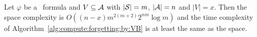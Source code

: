 \documentclass{article}
\begin{document}
\begin{proposition}\label{pro:time:alg1}
Let $\varphi$ be a \CTL\ formula and $V\subseteq {\cal A}$ with $|{\cal S}|=m$, $|{\cal A}|=n$ and $|V|=x$. Then the space complexity is $O((n-x)m^{2(m+2)}2^{nm}  \log m)$ and the time complexity of Algorithm~\ref{alg:compute:forgetting:by:VB} is at least the same as the space.%
\end{proposition}
\end{document}
